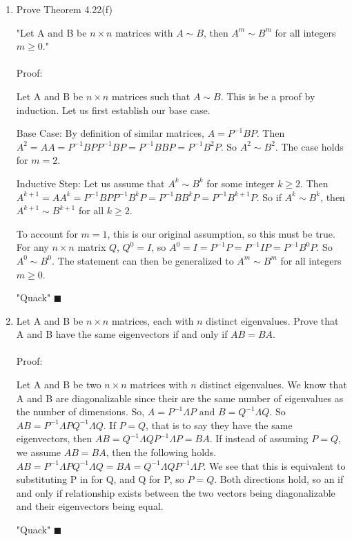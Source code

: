 \documentclass{article}
\newcommand\tab[1][1cm]{\hspace*{#1}}
\begin{document}
\begin{enumerate}
\item
\tab Prove Theorem 4.22(f)\par
"Let A and B be $n \times n$ matrices with $A \sim B$, then $A^{m} \sim B^{m}$ for all integers $m \geq 0$."\\\\
Proof:\par
Let A and B be $n \times n$ matrices such that $A \sim B$. This is be a proof by induction. Let us first establish our base case.\par
Base Case: By definition of similar matrices, $A = P^{-1}BP$. Then $A^2 = AA = P^{-1}BPP^{-1}BP = P^{-1}BBP = P^{-1}B^2P$. So $A^2 \sim B^2$. The case holds for $m = 2$. \par
Inductive Step: Let us assume that $A^k \sim B^k$ for some integer $k \geq 2$. Then $A^{k+1} = AA^{k} = P^{-1}BPP^{-1}B^kP = P^{-1}BB^kP = P^{-1}B^{k+1}P$. So if $A^k \sim B^k$, then $A^{k+1} \sim B^{k+1}$ for all $ k \geq 2$.\par
To account for $m = 1$, this is our original assumption, so this must be true. For any $n \times n$ matrix $Q$, $Q^0 = I$, so $A^0 = I = P^{-1}P = P^{-1}IP = P^{-1}B^0P$. So $A^0 \sim B^0$. The statement can then be generalized to $A^m \sim B^m$ for all integers $m \geq 0$.\par
{\raggedleft "Quack"  $\blacksquare$\\}

\item
Let A and B be $n \times n$ matrices, each with $n$ distinct eigenvalues. Prove that A and B have the same eigenvectors if and only if $AB = BA$.\\\\
Proof:\par
Let A and B be two $n \times n$ matrices with $n$ distinct eigenvalues. We know that A and B are diagonalizable since their are the same number of eigenvalues as the number of dimensions. So, $A = P^{-1} \Lambda P$ and $B = Q^{-1} \Lambda Q$. So $AB = P^{-1} \Lambda PQ^{-1} \Lambda Q$. If $P = Q$, that is to say they have the same eigenvectors, then $AB = Q^{-1} \Lambda QP^{-1} \Lambda P = BA$. If instead of assuming $P = Q$, we assume $AB = BA$, then the following holds. $AB = P^{-1}\Lambda PQ^{-1} \Lambda Q = BA = Q^{-1}\Lambda QP^{-1}\Lambda P$. We see that this is equivalent to substituting P in for Q, and Q for P, so $P = Q$. Both directions hold, so an if and only if relationship exists between the two vectors being diagonalizable and their eigenvectors being equal.\par
{\raggedleft "Quack"  $\blacksquare$\\}


\end{enumerate}
\end{document}
